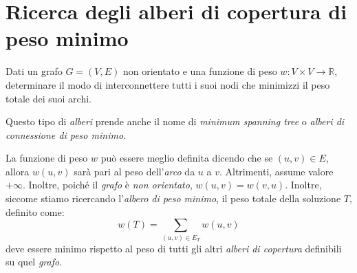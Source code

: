 \section{Ricerca degli alberi di copertura di peso minimo}
\begin{problem}
    Dati un grafo $G=(V,E)$ non orientato e una funzione di peso $w:V\times
    V\to\mathbb{R}$, determinare il modo di interconnettere tutti i suoi
    nodi che minimizzi il peso totale dei suoi archi.
\end{problem}
\begin{note}
    Questo tipo di \emph{alberi} prende anche il nome di \emph{minimum spanning
    tree} o \emph{alberi di connessione di peso minimo}.
\end{note}

\noindent
La funzione di peso $w$ può essere meglio definita dicendo che se $(u,v)\in E$,
allora $w(u,v)$ sarà pari al peso dell'\emph{arco} da $u$ a $v$. Altrimenti,
assume valore $+\infty$. Inoltre, poiché il \emph{grafo} è \emph{non orientato},
$w(u,v)=w(v,u)$. Inoltre, siccome stiamo ricercando l'\emph{albero di peso
minimo}, il peso totale della soluzione $T$, definito come:
\[w(T)=\sum_{(u,v)\in E_T}w(u,v)\]
deve essere minimo rispetto al peso di tutti gli altri \emph{alberi di copertura}
definibili su quel \emph{grafo}.


